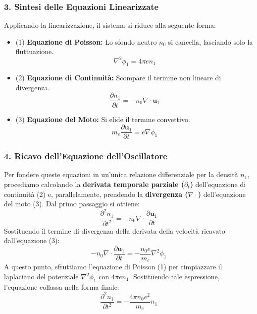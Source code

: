 \subsubsection{3. Sintesi delle Equazioni Linearizzate}
Applicando la linearizzazione, il sistema si riduce alla seguente forma:
\begin{itemize}
\item (1) \textbf{Equazione di Poisson:} Lo sfondo neutro $n_0$ si cancella, lasciando solo la fluttuazione.
\begin{equation}
\nabla^2\phi_1 = 4\pi e n_1
\end{equation}
\item (2) \textbf{Equazione di Continuità:} Scompare il termine non lineare di divergenza.
\begin{equation}
\frac{\partial n_1}{\partial t} = -n_0 \nabla \cdot \mathbf{u}_1
\end{equation}
\item (3) \textbf{Equazione del Moto:} Si elide il termine convettivo.
\begin{equation}
m_e \frac{\partial \mathbf{u}_1}{\partial t} = e \nabla\phi_1
\end{equation}
\end{itemize}

\subsubsection{4. Ricavo dell'Equazione dell'Oscillatore}
Per fondere queste equazioni in un'unica relazione differenziale per la densità $n_1$, procediamo calcolando la \textbf{derivata temporale parziale ($\partial_t$)} dell'equazione di continuità (2) e, parallelamente, prendendo la \textbf{divergenza ($\nabla\cdot$)} dell'equazione del moto (3).
Dal primo passaggio si ottiene:
\begin{equation}
\frac{\partial^2 n_1}{\partial t^2} = -n_0 \nabla \cdot \frac{\partial \mathbf{u}_1}{\partial t}
\end{equation}
Sostituendo il termine di divergenza della derivata della velocità ricavato dall'equazione (3):
\begin{equation}
-n_0 \nabla \cdot \frac{\partial \mathbf{u}_1}{\partial t} = -\frac{n_0 e}{m_e} \nabla^2\phi_1
\end{equation}
A questo punto, sfruttiamo l'equazione di Poisson (1) per rimpiazzare il laplaciano del potenziale $\nabla^2\phi_1$ con $4\pi e n_1$. Sostituendo tale espressione, l'equazione collassa nella forma finale:
\begin{equation}
\frac{\partial^2 n_1}{\partial t^2} = -\frac{4\pi n_0 e^2}{m_e} n_1
\end{equation}

